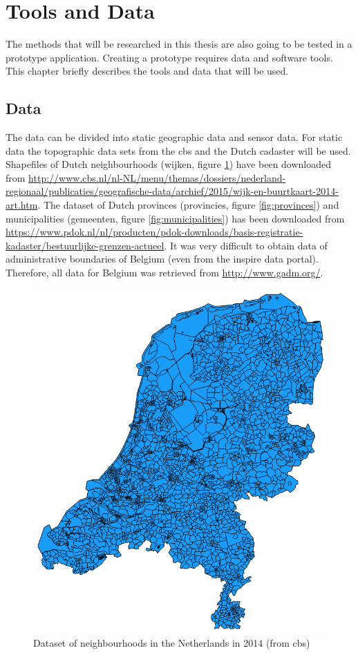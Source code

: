 

\section{Tools and Data}
\label{chap:TD}

The methods that will be researched in this thesis are also going to be tested in a prototype application. Creating a prototype requires data and software tools. This chapter briefly describes the tools and data that will be used.  

\subsection{Data}
\begin{sloppypar}
The data can be divided into static geographic data and sensor data. For static data the topographic data sets from the \ac{cbs} and the Dutch cadaster will be used. Shapefiles of Dutch neighbourhoods (wijken, figure \ref{fig:neighbourhoods}) have been downloaded from \url{http://www.cbs.nl/nl-NL/menu/themas/dossiers/nederland-regionaal/publicaties/geografische-data/archief/2015/wijk-en-buurtkaart-2014-art.htm}. The dataset of Dutch provinces (provincies, figure \ref{fig:provinces}) and municipalities (gemeenten, figure \ref{fig:municipalities}) has been downloaded from \url{https://www.pdok.nl/nl/producten/pdok-downloads/basis-registratie-kadaster/bestuurlijke-grenzen-actueel}. It was very difficult to obtain data of administrative boundaries of Belgium (even from the \ac{inspire} data portal). Therefore, all data for Belgium was retrieved from \url{http://www.gadm.org/}.
\end{sloppypar}

\begin{figure}
	\centering
	\includegraphics[width=0.5\linewidth]{figs/Neighbourhoods.png}
	\caption{Dataset of neighbourhoods in the Netherlands in 2014 (from \ac{cbs})}
	\label{fig:neighbourhoods}
\end{figure}

